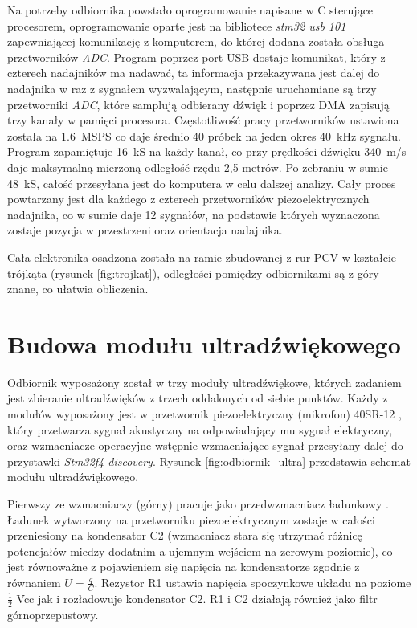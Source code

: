 Na potrzeby odbiornika powstało oprogramowanie napisane w C sterujące procesorem,
oprogramowanie oparte jest na bibliotece \textit{stm32 usb 101} \cite{bib:stm32_usb_101}
zapewniającej komunikację z komputerem, do której dodana została obsługa przetworników \textit{ADC}.
Program poprzez port USB dostaje komunikat, który z czterech nadajników ma nadawać, ta informacja przekazywana jest
dalej do nadajnika w raz z sygnałem wyzwalającym, następnie uruchamiane są trzy przetworniki \textit{ADC}, które 
samplują odbierany dźwięk i poprzez DMA zapisują trzy kanały w pamięci procesora.
Częstotliwość pracy przetworników ustawiona została na \SI{1,6}{MSPS} co daje średnio 40 próbek na jeden okres \SI{40}{kHz} sygnału.
Program zapamiętuje \SI{16}{kS} na każdy kanał, co przy prędkości dźwięku \SI{340}{m/s} daje maksymalną mierzoną odległość rzędu 2,5 metrów.
Po zebraniu w sumie \SI{48}{kS}, całość przesyłana jest do komputera w celu dalszej analizy.
Cały proces powtarzany jest dla każdego z czterech przetworników piezoelektrycznych nadajnika, 
co w sumie daje 12 sygnałów, na podstawie których wyznaczona zostaje 
pozycja w przestrzeni oraz orientacja nadajnika.

Cała elektronika osadzona została na ramie zbudowanej z rur PCV w kształcie trójkąta (rysunek \ref{fig:trojkat}), 
odległości pomiędzy odbiornikami są z góry znane, co ułatwia obliczenia.




\clearpage
\section{Budowa modułu ultradźwiękowego}

Odbiornik wyposażony został w trzy moduły ultradźwiękowe, których zadaniem jest 
zbieranie ultradźwięków z trzech oddalonych od siebie punktów.
Każdy z modułów wyposażony jest w przetwornik piezoelektryczny (mikrofon) 40SR-12 \cite{bib:40ST12},
który przetwarza sygnał akustyczny na odpowiadający mu sygnał elektryczny, oraz wzmacniacze operacyjne 
wstępnie wzmacniające sygnał przesyłany dalej do przystawki \textit{Stm32f4-discovery}.
Rysunek \ref{fig:odbiornik_ultra} przedstawia schemat modułu ultradźwiękowego.


Pierwszy ze wzmacniaczy (górny) pracuje jako przedwzmacniacz ładunkowy \cite{bib:wzm_ladunkowy}.
Ładunek wytworzony na przetworniku piezoelektrycznym zostaje w całości przeniesiony na kondensator C2 
(wzmacniacz stara się utrzymać różnicę potencjałów miedzy dodatnim a ujemnym wejściem na zerowym poziomie),
co jest równoważne z pojawieniem się napięcia na kondensatorze zgodnie z równaniem $U=\frac{q}{C}$.
Rezystor R1 ustawia napięcia spoczynkowe układu na poziome $\frac{1}{2}$ Vcc jak i rozładowuje kondensator C2.
R1 i C2 działają również jako filtr górnoprzepustowy.

